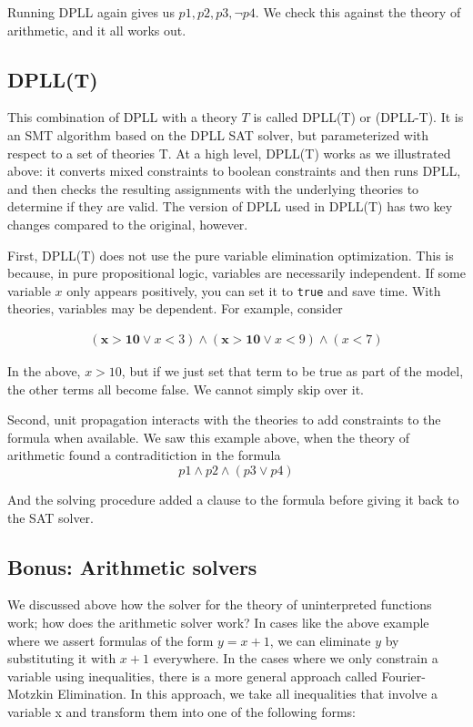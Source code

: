 \documentclass[11pt]{article}
\begin{document}
Running DPLL again gives us $p1, p2, p3, \lnot p4$. We check this against the
theory of arithmetic, and it all works out.

\subsection{DPLL(T)} 

This combination of DPLL with a theory $T$ is called DPLL(T) or (DPLL-T).  It is
an SMT algorithm based on the DPLL SAT solver, but parameterized with respect to
a set of theories T.  
%
At a high level, DPLL(T) works as we illustrated above: it converts mixed
constraints to boolean constraints and then runs DPLL, and then checks the
resulting assignments with the underlying theories to determine if they are
valid. The version of DPLL used in DPLL(T) has two key changes compared to the
original, however.

First, DPLL(T) does not use the pure variable elimination optimization.  This is
because, in pure propositional logic, variables are necessarily independent.  If
some variable $x$ only appears positively, you can set it to \texttt{true} and
save time.  With theories, variables may be dependent.  For example, consider

\[
\begin{array}{c}
(\mathbf{x > 10} \lor x < 3) \land (\mathbf{x > 10} \lor x < 9) \land (x < 7)
\end{array}
\]

In the above, $x > 10$, but if we just set that term to be true as part of the
model, the other terms all become false.  We cannot simply skip over it. 

Second, unit propagation interacts with the theories to add constraints to the
formula when available.  We saw this example above, when the theory of
arithmetic found a contraditiction in the formula 
\[
p1 \land p2 \land (p3 \lor p4)
\]

And the solving procedure added a clause to the formula before giving it back to
the SAT solver. 

\subsection{Bonus: Arithmetic solvers}

We discussed above how the solver for the theory of uninterpreted functions
work; how does the arithmetic solver work? In cases like the above example where
we assert formulas of the form $y = x + 1$, we can eliminate $y$ by substituting
it with $x+1$ everywhere. In the cases where we only constrain a variable using
inequalities, there is a more general approach called Fourier-Motzkin
Elimination. In this approach, we take all inequalities that involve a variable
x and transform them into one of the following forms:
\end{document}
